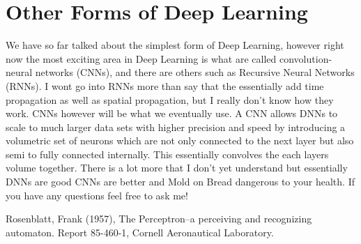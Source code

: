 \documentclass[a4paper]{article}
\begin{document}
\section{Other Forms of Deep Learning}
We have so far talked about the simplest form of Deep Learning, however right now the most exciting area in Deep Learning is what are called convolution-neural networks (CNNs), and there are others such as Recursive Neural Networks (RNNs). I wont go into RNNs more than say that the essentially add time propagation as well as spatial propagation, but I really don't know how they work. CNNs however will be what we eventually use. A CNN allows DNNs to scale to much larger data sets with higher precision and speed by introducing a volumetric set of neurons which are not only connected to the next layer but also semi to fully connected internally. This essentially convolves the each layers volume together. There is a lot more that I don't yet understand but essentially DNNs are good CNNs are better and Mold on Bread dangerous to your health. If you have any questions feel free to ask me!
\begin{thebibliography}{9}
 Rosenblatt, Frank (1957), The Perceptron--a perceiving and recognizing automaton. Report 85-460-1, Cornell Aeronautical Laboratory.
\end{thebibliography}
\end{document}
